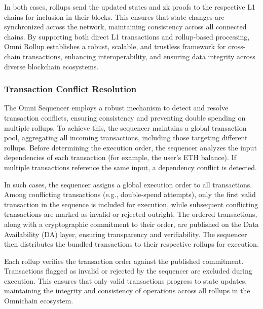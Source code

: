 In both cases, rollups send the updated states and zk proofs to the respective L1 chains for inclusion in their blocks. This ensures that state changes are synchronized across the network, maintaining consistency across all connected chains. By supporting both direct L1 transactions and rollup-based processing, Omni Rollup establishes a robust, scalable, and trustless framework for cross-chain transactions, enhancing interoperability, and ensuring data integrity across diverse blockchain ecosystems.  

\subsubsection{Transaction Conflict Resolution}
The Omni Sequencer employs a robust mechanism to detect and resolve transaction conflicts, ensuring consistency and preventing double spending on multiple rollups. To achieve this, the sequencer maintains a global transaction pool, aggregating all incoming transactions, including those targeting different rollups. Before determining the execution order, the sequencer analyzes the input dependencies of each transaction (for example, the user's ETH balance). If multiple transactions reference the same input, a dependency conflict is detected.

In such cases, the sequencer assigns a global execution order to all transactions. Among conflicting transactions (e.g., double-spend attempts), only the first valid transaction in the sequence is included for execution, while subsequent conflicting transactions are marked as invalid or rejected outright. The ordered transactions, along with a cryptographic commitment to their order, are published on the Data Availability (DA) layer, ensuring transparency and verifiability. The sequencer then distributes the bundled transactions to their respective rollups for execution.

Each rollup verifies the transaction order against the published commitment. Transactions flagged as invalid or rejected by the sequencer are excluded during execution. This ensures that only valid transactions progress to state updates, maintaining the integrity and consistency of operations across all rollups in the Omnichain ecosystem.